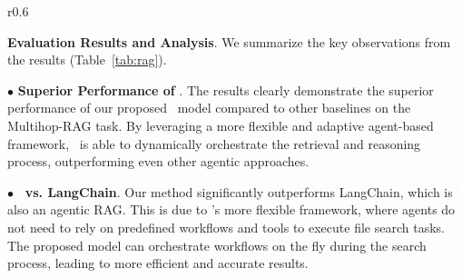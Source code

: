 \begin{wraptable}[9]{r}{0.6\textwidth}
\vspace{-1.5em}
\centering
\caption{Evaluation of \model\ and baselines for RAG.}
\label{tab:rag}
\vspace{-1em}
\end{wraptable}

\noindent \textbf{Evaluation Results and Analysis}. We summarize the key observations from the results (Table~\ref{tab:rag}).

$\bullet$ \textbf{Superior Performance of \model}. The results clearly demonstrate the superior performance of our proposed \model\ model compared to other baselines on the Multihop-RAG task. By leveraging a more flexible and adaptive agent-based framework, \model\ is able to dynamically orchestrate the retrieval and reasoning process, outperforming even other agentic approaches.

$\bullet$ \textbf{\model\ vs. LangChain}. Our method significantly outperforms LangChain, which is also an agentic RAG. This is due to \model's more flexible framework, where agents do not need to rely on predefined workflows and tools to execute file search tasks. The proposed model can orchestrate workflows on the fly during the search process, leading to more efficient and accurate results.

